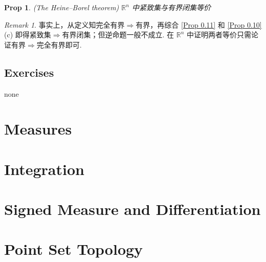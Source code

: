 \documentclass[hidelinks]{article}
\theoremstyle{definition}
\theoremstyle{plain}
\newtheorem{proposition}[theorem]{Prop}
\theoremstyle{remark}
\newtheorem*{remark}{Remark}
\begin{document}
\begin{proposition}(The Heine–Borel theorem)
$\mathbb{R}^n$ 中紧致集与有界闭集等价
\end{proposition}

\begin{remark}
事实上，从定义知完全有界$\Rightarrow$有界，再综合 \autoref{Prop 0.11} 和 \autoref{Prop 0.10} (c) 即得紧致集$\Rightarrow$有界闭集；但逆命题一般不成立. 在 $\mathbb{R}^n$ 中证明两者等价只需论证有界$\Rightarrow$完全有界即可.
\end{remark}


\subsection{Exercises}
none

\newpage



\section{Measures}
\newpage
\section{Integration}
\newpage
\section{Signed Measure and Differentiation}
\newpage




\section{Point Set Topology}
\end{document}
